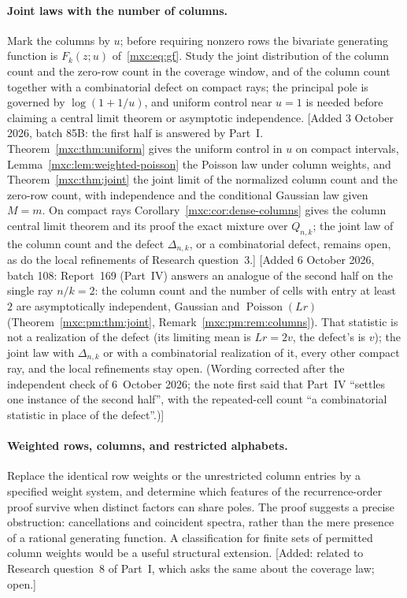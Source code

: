\documentclass[11pt]{article}
\numberwithin{equation}{section}
\theoremstyle{definition}
\theoremstyle{remark}
\DeclareMathOperator{\Pois}{Poisson}
\begin{document}
\paragraph{Joint laws with the number of columns.} Mark the columns by
$u$; before requiring nonzero rows the bivariate generating function is
$F_k(z;u)$ of~\eqref{mxc:eq:gf}. Study the joint distribution of the
column count and the zero-row count in the coverage window, and of the
column count together with a combinatorial defect on compact rays; the
principal pole is governed by $\log(1+1/u)$, and uniform control near
$u=1$ is needed before claiming a central limit theorem or asymptotic
independence. [Added 3 October 2026, batch 85B: the first half is
answered by Part~I. Theorem~\ref{mxc:thm:uniform} gives the uniform
control in $u$ on compact intervals, Lemma~\ref{mxc:lem:weighted-poisson}
the Poisson law under column weights, and Theorem~\ref{mxc:thm:joint} the
joint limit of the normalized column count and the zero-row count, with
independence and the conditional Gaussian law given $M=m$. On compact
rays Corollary~\ref{mxc:cor:dense-columns} gives the column central limit
theorem and its proof the exact mixture over $Q_{n,k}$; the joint law of
the column count and the defect $\Delta_{n,k}$, or a combinatorial
defect, remains open, as do the local refinements of Research
question~3.] [Added 6 October 2026, batch 108: Report~169 (Part~IV) answers an
analogue of the second half on the single ray $n/k=2$: the column count and
the number of cells with entry at least~$2$ are asymptotically independent,
Gaussian and $\Pois(Lr)$ (Theorem~\ref{mxc:pm:thm:joint},
Remark~\ref{mxc:pm:rem:columns}). That statistic is not a realization of the
defect (its limiting mean is $Lr=2v$, the defect's is $v$); the joint law with
$\Delta_{n,k}$ or with a combinatorial realization of it, every other compact
ray, and the local refinements stay open. (Wording corrected after the
independent check of 6~October 2026; the note first said that Part~IV
``settles one instance of the second half'', with the repeated-cell count ``a
combinatorial statistic in place of the defect''.)]

\paragraph{Weighted rows, columns, and restricted alphabets.} Replace the
identical row weights or the unrestricted column entries by a specified
weight system, and determine which features of the recurrence-order proof
survive when distinct factors can share poles. The proof suggests a
precise obstruction: cancellations and coincident spectra, rather than
the mere presence of a rational generating function. A classification for
finite sets of permitted column weights would be a useful structural
extension. [Added: related to Research question~8 of Part~I, which asks
the same about the coverage law; open.]
\end{document}
